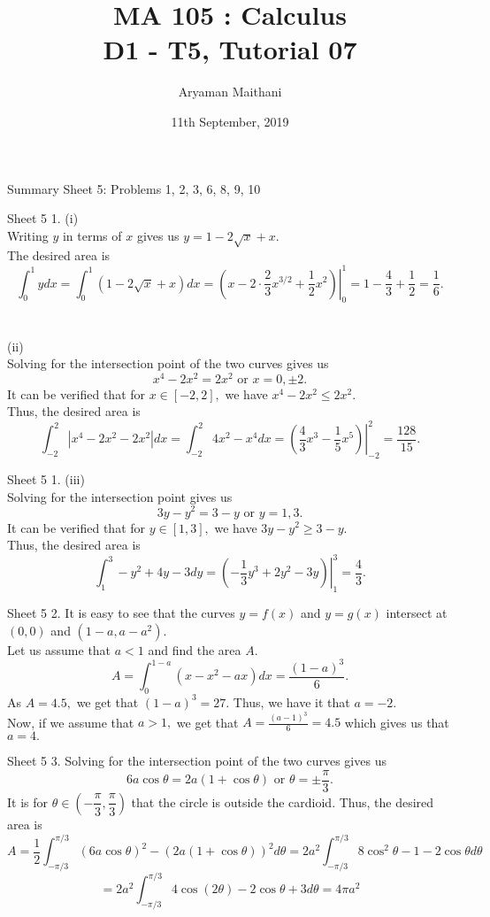 \documentclass[handout, aspectratio=169]{beamer}
\title{MA 105 : Calculus\\ D1 - T5, Tutorial 07}  %
\author{Aryaman Maithani}
\date[11-09-2019]{11th September, 2019}               %
\institute[IITB]{IIT Bombay}
\begin{document}
\begin{frame}
	\titlepage
\end{frame}
\begin{frame}{Summary} 
	Sheet 5: Problems 1, 2, 3, 6, 8, 9, 10
\end{frame}
\begin{frame}{Sheet 5}                            %
	1. (i)\\
	Writing $y$ in terms of $x$ gives us $y = 1 - 2\sqrt{x} + x.$\\
	The desired area is $$\displaystyle\int_{0}^{1} y dx = \int_{0}^{1} (1 - 2\sqrt{x} + x) dx = \left.\left(x - 2\cdot\frac{2}{3}x^{3/2} + \frac{1}{2}x^2\right)\right|_{0}^{1} = 1 - \frac{4}{3} + \dfrac{1}{2} = \frac{1}{6}. $$\\~\\
	(ii)\\
	Solving for the intersection point of the two curves gives us
	\[x^4 - 2x^2 = 2x^2 \text{ or } x = 0, \pm 2.\]
	It can be verified that for $x \in [-2, 2],$ we have $x^4 - 2x^2 \le 2x^2.$\\
	Thus, the desired area is
	\[\int_{-2}^{2} |x^4 - 2x^2 - 2x^2| dx = \int_{-2}^{2} 4x^2 - x^4 dx = \left.\left(\frac{4}{3}x^3 - \frac{1}{5}x^5\right)\right|_{-2}^{2} = \frac{128}{15}.\]
	
\end{frame}
\begin{frame}{Sheet 5}
	1. (iii)\\
	Solving for the intersection point gives us
	\[3y - y^2 = 3 - y \text{ or } y = 1, 3.\]
	It can be verified that for $y \in [1, 3],$ we have $3y - y^2 \ge 3 - y.$\\
	Thus, the desired area is
	\[\int_{1}^{3} -y^2 + 4y - 3 dy = \left.\left(-\frac{1}{3}y^3 + 2y^2 - 3y\right)\right|_1^3 = \frac{4}{3}. \]
\end{frame}
\begin{frame}{Sheet 5}
	2. It is easy to see that the curves $y = f(x)$ and $y = g(x)$ intersect at $(0, 0)$ and $(1-a, a-a^2).$\\
	Let us assume that $a < 1$ and find the area $A.$
	\[A = \int_{0}^{1-a} (x - x^2 - ax) dx = \frac{(1-a)^3}{6}.\]
	As $A = 4.5,$ we get that $(1 - a)^3 = 27.$ Thus, we have it that $a = -2.$\\
	Now, if we assume that $a > 1,$ we get that $A = \frac{(a-1)^3}{6} = 4.5$ which gives us that $a = 4.$
\end{frame}
\begin{frame}{Sheet 5}
	3. Solving for the intersection point of the two curves gives us
	\[6a\cos\theta = 2a(1+\cos\theta) \text{ or } \theta = \pm\frac{\pi}{3}.\]
	It is for $\theta \in \left(-\dfrac{\pi}{3}, \dfrac{\pi}{3}\right)$ that the circle is outside the cardioid. Thus, the desired area is
	\[A = \frac{1}{2}\int_{-\pi/3}^{\pi/3} (6a\cos\theta)^2 - (2a(1 + \cos\theta))^2 d\theta = 2a^2\int_{-\pi/3}^{\pi/3} 8\cos^2\theta - 1 - 2\cos\theta d\theta\]
	\[= 2a^2\int_{-\pi/3}^{\pi/3} 4\cos(2\theta) - 2\cos\theta + 3 d\theta = 4\pi a^2 \]
\end{frame}
\end{document}
